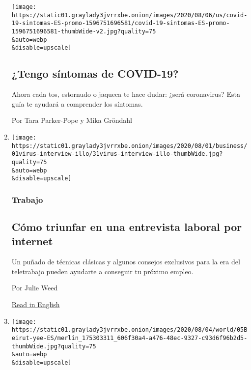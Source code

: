 \begin{enumerate}
  \texttt{[image: https://static01.graylady3jvrrxbe.onion/images/2020/08/06/us/covid-19-sintomas-ES-promo-1596751696581/covid-19-sintomas-ES-promo-1596751696581-thumbWide-v2.jpg?quality=75\\\&auto=webp\\\&disable=upscale]}

  \hypertarget{tengo-suxedntomas-de-covid-19-1}{%
  \subsection{¿Tengo síntomas de
  COVID-19?}\label{tengo-suxedntomas-de-covid-19-1}}

  Ahora cada tos, estornudo o jaqueca te hace dudar: ¿será coronavirus?
  Esta guía te ayudará a comprender los síntomas.

  Por Tara Parker-Pope y Mika Gröndahl
\item
  \href{/es/2020/08/06/espanol/negocios/entrevista-de-trabajo-internet.html}{}

  \texttt{[image: https://static01.graylady3jvrrxbe.onion/images/2020/08/01/business/01virus-interview-illo/31virus-interview-illo-thumbWide.jpg?quality=75\\\&auto=webp\\\&disable=upscale]}

  \hypertarget{trabajo}{%
  \subsubsection{Trabajo}\label{trabajo}}

  \hypertarget{cuxf3mo-triunfar-en-una-entrevista-laboral-por-internet}{%
  \subsection{Cómo triunfar en una entrevista laboral por
  internet}\label{cuxf3mo-triunfar-en-una-entrevista-laboral-por-internet}}

  Un puñado de técnicas clásicas y algunos consejos exclusivos para la
  era del teletrabajo pueden ayudarte a conseguir tu próximo empleo.

  Por Julie Weed

  \href{https://www.nytimes3xbfgragh.onion/2020/08/03/business/online-job-interview-tips.html}{Read
  in English}
\item
  \href{/es/2020/08/05/espanol/mundo/libano-explosion-beirut.html}{}

  \texttt{[image: https://static01.graylady3jvrrxbe.onion/images/2020/08/04/world/05Beirut-yee-ES/merlin\_175303311\_606f30a4-a476-48ec-9327-c93d6f96b2d5-thumbWide.jpg?quality=75\\\&auto=webp\\\&disable=upscale]}


\end{enumerate}
